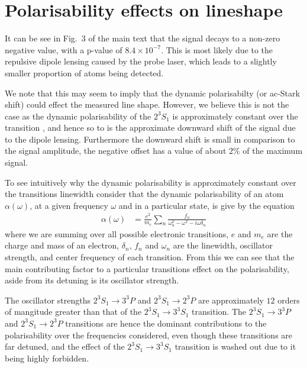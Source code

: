 \documentclass[%
 amsmath,amssymb,
aps,
]{revtex4-2}
\newcommand{\UpperState}{3^{3\!}S_1}%
\newcommand{\MetastableState}{2^{3\!}S_1}%
\begin{document}
\section{Polarisability effects on lineshape}
It can be see in Fig.~3 of the main text that the signal decays to a non-zero negative value, with a p-value of \(8.4 \times 10^{-7}\). This is most likely due to the repulsive dipole lensing caused by the probe laser, which leads to a slightly smaller proportion of atoms being detected.

We note that this may seem to imply that the dynamic polarisabilty (or ac-Stark shift) could effect the measured line shape. However, we believe this is not the case as the dynamic polarisability of the \(\MetastableState\) is approximately constant over the transition \cite{PhysRevA.88.052515,astapenko2013polarization,LeKien2013}, and hence so to is the approximate downward shift of the signal due to the dipole lensing. Furthermore the downward shift is small in comparison to the signal amplitude, the negative offset has a value of about \(2\%\) of the maximum signal. 

To see intuitively why the dynamic polarisability is approximately constant over the transitions linewidth consider that the dynamic polarisability of an atom \(\alpha(\omega)\), at a given frequency \(\omega\) and in a particular state, is give by the equation \cite{astapenko2013polarization,LeKien2013}
\begin{align}
    \alpha (\omega) &= \frac{e^2}{m_e} \sum_n \frac{f_n}{\omega_n^2-\omega^2- i \omega \delta_n}
\end{align}
where we are summing over all possible electronic transitions, \(e\) and \(m_e\) are the charge and mass of an electron, \(\delta_n\), \(f_n\) and \(\omega_n\) are the linewidth, oscillator strength, and center frequency of each transition. From this we can see that the main contributing factor to a particular transitions effect on the polarisability, aside from its detuning is its oscillator strength.

The oscillator strengths \(\MetastableState \rightarrow 3^{3\!}P\) and \(\MetastableState \rightarrow 2^{3\!}P\) are approximately \(12\) orders of mangitude greater than that of the \(\MetastableState \rightarrow \UpperState\) transition.  The \(\MetastableState \rightarrow 3^{3\!}P\) and \(\MetastableState \rightarrow 2^{3\!}P\) transitions are hence the dominant contributions to the polarisability over the frequencies considered, even though these transitions are far detuned, and the effect of the \(\MetastableState \rightarrow \UpperState\) transition is washed out due to it being highly forbidden.
\end{document}
